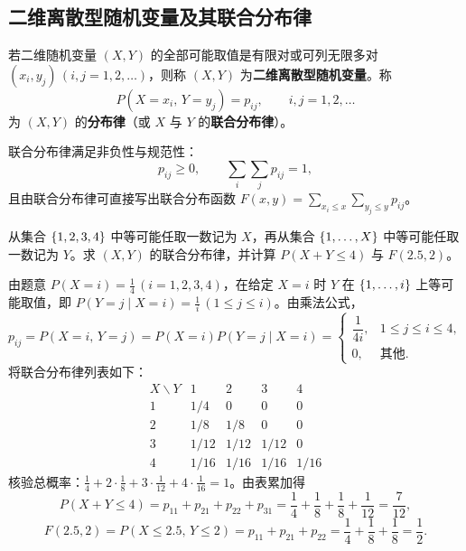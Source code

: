 \subsection{二维离散型随机变量及其联合分布律}

\begin{definition}[二维离散型随机变量与联合分布律]
\label{def:joint-pmf}
若二维随机变量 $(X,Y)$ 的全部可能取值是有限对或可列无限多对 $(x_i,y_j)\,(i,j=1,2,\ldots)$，则称 $(X,Y)$ 为\textbf{二维离散型随机变量}。称
\begin{equation}
  P(X=x_i,\,Y=y_j)=p_{ij},\qquad i,j=1,2,\ldots
  \label{eq:joint-pmf}
\end{equation}
为 $(X,Y)$ 的\textbf{分布律}（或 $X$ 与 $Y$ 的\textbf{联合分布律}）。
\end{definition}

联合分布律满足非负性与规范性：
\[
  p_{ij}\ge 0,\qquad \sum_{i}\sum_{j}p_{ij}=1,
\]
且由联合分布律可直接写出联合分布函数 $F(x,y)=\sum_{x_i\le x}\sum_{y_j\le y}p_{ij}$。

\begin{example}[title={分层随机取整数的联合分布律}]
\label{eg:hierarchical-integers}
从集合 $\{1,2,3,4\}$ 中等可能任取一数记为 $X$，再从集合 $\{1,\ldots,X\}$ 中等可能任取一数记为 $Y$。求 $(X,Y)$ 的联合分布律，并计算 $P(X+Y\le 4)$ 与 $F(2.5,2)$。
\begin{solution}
由题意 $P(X=i)=\frac{1}{4}\,(i=1,2,3,4)$，在给定 $X=i$ 时 $Y$ 在 $\{1,\ldots,i\}$ 上等可能取值，即 $P(Y=j\mid X=i)=\frac{1}{i}\,(1\le j\le i)$。由乘法公式，
\[
  p_{ij}=P(X=i,\,Y=j)=P(X=i)P(Y=j\mid X=i)=
  \begin{cases}
    \dfrac{1}{4i},& 1\le j\le i\le 4,\\
    0,& \text{其他}.
  \end{cases}
\]
将联合分布律列表如下：
\[
\begin{array}{c|cccc}
  X\backslash Y & 1 & 2 & 3 & 4 \\ \hline
  1 & 1/4 & 0 & 0 & 0 \\
  2 & 1/8 & 1/8 & 0 & 0 \\
  3 & 1/12 & 1/12 & 1/12 & 0 \\
  4 & 1/16 & 1/16 & 1/16 & 1/16
\end{array}
\]
核验总概率：$\frac{1}{4}+2\cdot\frac{1}{8}+3\cdot\frac{1}{12}+4\cdot\frac{1}{16}=1$。由表累加得
\[
  P(X+Y\le 4)=p_{11}+p_{21}+p_{22}+p_{31}
  =\frac{1}{4}+\frac{1}{8}+\frac{1}{8}+\frac{1}{12}=\frac{7}{12},
\]
\[
  F(2.5,2)=P(X\le 2.5,\,Y\le 2)=p_{11}+p_{21}+p_{22}=\frac{1}{4}+\frac{1}{8}+\frac{1}{8}=\frac{1}{2}.
\]
\end{solution}
\end{example}

